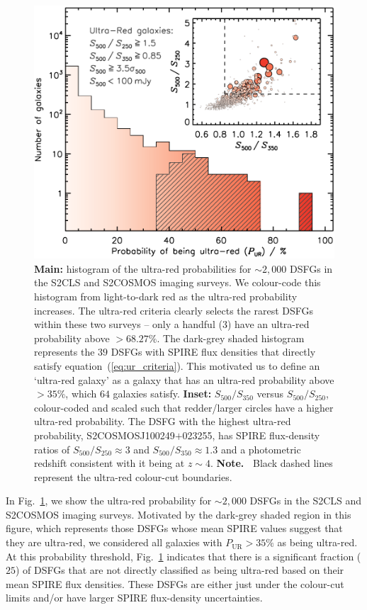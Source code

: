 \documentclass[a4paper, fleqn, usenatbib]{mnras}
\newcommand{\pur}{P_{\text{UR}}}
\newcommand{\urg}{ultra-red galaxy}
\begin{document}
\begin{figure}
    \includegraphics[width=\columnwidth]{prob_ur_s2}
    \caption{\textbf{Main:} histogram of the ultra-red probabilities for $\sim2{,}000$ DSFGs in the S2CLS and S2COSMOS imaging surveys.
    We colour-code this histogram from light-to-dark red as the ultra-red probability increases.
    The ultra-red criteria clearly selects the rarest DSFGs within these two surveys -- only a handful ($3$) have an ultra-red probability above $>68.27\%$.
    The dark-grey shaded histogram represents the $39$ DSFGs with SPIRE flux densities that directly satisfy equation~(\ref{eq:ur_criteria}).
    This motivated us to define an `\urg{}' as a galaxy that has an ultra-red probability above $>35\%$, which $64$ galaxies satisfy.
    \textbf{Inset:} $S_{500}/S_{350}$ versus $S_{500}/S_{250}$, colour-coded and scaled such that redder/larger circles have a higher ultra-red probability.
    The DSFG with the highest ultra-red probability, S2COSMOSJ100249$+$023255, has SPIRE flux-density ratios of $S_{500}/S_{250}\approx3$ and $S_{500}/S_{350}\approx1.3$ and a photometric redshift consistent with it being at $z\sim4$.
    \textbf{Note.\ } Black dashed lines represent the ultra-red colour-cut boundaries.
    }
    \label{fig:prob_ur_s2}
\end{figure}

In Fig.~\ref{fig:prob_ur_s2}, we show the ultra-red probability for $\sim2{,}000$ DSFGs in the S2CLS and S2COSMOS imaging surveys.
Motivated by the dark-grey shaded region in this figure, which represents those DSFGs whose mean SPIRE values suggest that they are ultra-red, we considered all galaxies with $\pur{}>35\%$ as being ultra-red.
At this probability threshold, Fig.~\ref{fig:prob_ur_s2} indicates that there is a significant fraction ($25$) of DSFGs that are not directly classified as being ultra-red based on their mean SPIRE flux densities.
These DSFGs are either just under the colour-cut limits and/or have larger SPIRE flux-density uncertainties.
\end{document}
